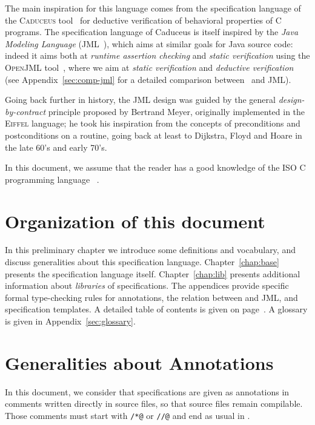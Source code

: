 The main inspiration for this language comes from the
specification language of the \textsc{Caduceus}
tool~\cite{filliatre04icfem,filliatre07cav} for deductive verification
of behavioral properties of C programs. The specification language of
Caduceus is itself inspired by the
\emph{Java Modeling Language} (JML~\cite{leavens00jml}), which aims at
similar goals for Java source code: indeed it aims both at
\emph{runtime assertion checking} and \emph{static verification} using
the \textsc{OpenJML} tool~\cite{Cok-2011-OpenJML,Cok-2014-OpenJML}, where we aim at
\emph{static verification} and \emph{deductive verification} (see
Appendix~\ref{sec:comp-jml} for a detailed comparison between \NAME~and
JML).

Going back further in history, the JML design was guided by the general
\emph{design-by-contract} principle proposed by Bertrand Meyer,
originally implemented in
the \textsc{Eiffel} language;
he took his inspiration from the concepts of preconditions and
postconditions on a routine, going back at least to Dijkstra, Floyd and
Hoare in the late 60's and early 70's.

In this document, we assume that the reader has a good knowledge of
the ISO C programming language~\cite{KR88,standardc99} 
.

\section{Organization of this document}

In this preliminary chapter we introduce some definitions and
vocabulary, and discuss generalities about this specification
language.  Chapter~\ref{chap:base} presents the specification language
itself.  Chapter~\ref{chap:lib} presents additional information about
\emph{libraries} of specifications. The appendices provide
specific formal type-checking rules for \NAME annotations, 
the relation between \NAME and JML, and specification templates.
A detailed table of
contents is given on page~\pageref{chap:contents}.
A glossary is given in Appendix~\ref{sec:glossary}.

\section{Generalities about Annotations}\label{sec:gener-about-annot}

In this document, we consider that specifications are given as
annotations in comments written directly in \lang source files, so that
source files remain compilable. Those comments must start with
\verb|/*@| or \verb|//@| and end as usual in \lang.

